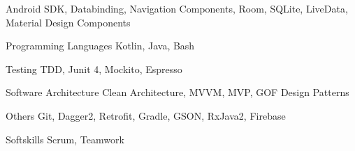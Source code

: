 
\begin{cvskills}

  \cvskill
    {Android} %
    {SDK, Databinding, Navigation Components, Room, SQLite, LiveData, Material Design Components} %

  \cvskill
    {Programming Languages} %
    {Kotlin, Java, Bash} %

  \cvskill
    {Testing} %
    {TDD, Junit 4, Mockito, Espresso} %

  \cvskill
    {Software Architecture} %
    {Clean Architecture, MVVM, MVP, GOF Design Patterns} %

  \cvskill
    {Others} %
    {Git, Dagger2, Retrofit, Gradle, GSON, RxJava2, Firebase} %

  \cvskill
    {Softskills} %
    {Scrum, Teamwork} %

\end{cvskills}